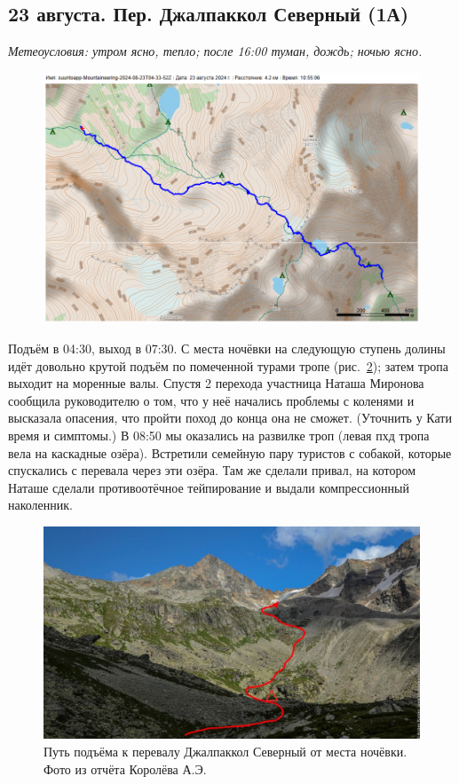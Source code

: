 \subsection{23 августа.  Пер. Джалпаккол Северный (1А)}
\textit{Метеоусловия: утром ясно, тепло; после 16:00 туман, дождь; ночью ясно.}

\begin{figure}[h!]
	\centering
	\includegraphics[angle=0, width=0.7\linewidth]{../pics/mini_maps/23}
	\label{fig:mini_23}
\end{figure}


Подъём в 04:30, выход в 07:30. С места ночёвки на следующую ступень долины идёт довольно крутой подъём по помеченной турами тропе (рис.~\ref{fig:23augstart}); затем тропа выходит на моренные валы. Спустя 2 перехода участница Наташа Миронова сообщила руководителю о том, что у неё начались проблемы с коленями и высказала опасения, что пройти поход до конца она не сможет. \alert{(Уточнить у Кати время и симптомы.)} В 08:50 мы оказались на развилке троп (левая пхд тропа вела на каскадные озёра). Встретили семейную пару туристов с собакой, которые спускались с перевала через эти озёра. Там же сделали привал, на котором Наташе сделали противоотёчное тейпирование и выдали компрессионный наколенник.

\begin{figure}[h!]
	\centering
	\includegraphics[angle=0, width=0.7\linewidth]{../pics/23augstart}
	\caption{Путь подъёма к перевалу Джалпаккол Северный от места ночёвки. Фото из отчёта Королёва А.Э. \cite{Korolyov2018}}
	\label{fig:23augstart}
\end{figure}

